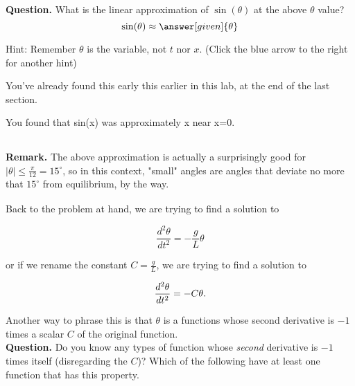 \documentclass[handout,nooutcomes]{ximera}
\begin{document}
\begin{example}
\begin{explanation}
\textbf{Question. } What is the linear approximation of $\sin(\theta)$ at the above $\theta$ value?\\

\[
\sin(\theta) \approx \answer[given]{\theta}
\]


Hint: Remember $\theta$ is the variable, not $t$ nor $x$. (Click the blue arrow to
the right for another hint)\\

\begin{expandable}
You've already found this early this earlier in this lab, at the end of the last section.
\begin{expandable}
You found that sin(x) was approximately x near x=0.\\
\end{expandable}
\end{expandable}

$\phantom{.}$\\
\medskip

\textbf{Remark. } The above approximation is actually a surprisingly good for
$|\theta|\leq \frac{\pi}{12} = 15^\circ$, so in this context, "small" angles
are angles that deviate no more that $15^\circ$ from equilibrium, by the way.\\

$\phantom{.}$\\
\medskip

Back to the problem at hand, we are trying to find a solution to

\[
\dfrac{d^2 \theta}{d t^2}  = -\dfrac{g}{L} \theta
\]

or if we rename the constant $C=\frac{g}{L}$, we are trying to find a solution to

\[
\dfrac{d^2 \theta}{d t^2}  = -C \theta.\\
\]

Another way to phrase this is that $\theta$ is a functions whose
second derivative is $-1$ times a scalar $C$ of the original function.\\


\textbf{Question.}  Do you know any types of function whose \emph{second} derivative
is $-1$ times itself (disregarding the $C$)? Which of the following have at least one function that has this property.\\

\begin{selectAll}
\end{selectAll}


\end{explanation}
\end{example}
\end{document}

